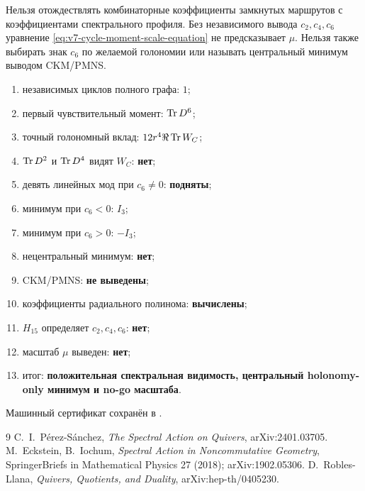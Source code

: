 \begin{nogocriterion}
Нельзя отождествлять комбинаторные коэффициенты замкнутых маршрутов с
коэффициентами спектрального профиля. Без независимого вывода
$c_2,c_4,c_6$ уравнение \eqref{eq:v7-cycle-moment-scale-equation} не
предсказывает $\mu$. Нельзя также выбирать знак $c_6$ по желаемой
голономии или называть центральный минимум выводом CKM/PMNS.
\end{nogocriterion}

\begin{protocol}
\begin{enumerate}
 \item независимых циклов полного графа: \textbf{$1$};
 \item первый чувствительный момент: \textbf{$\operatorname{Tr} D^6$};
 \item точный голономный вклад: \textbf{$12r^4\Re\operatorname{Tr} W_C$};
 \item $\operatorname{Tr} D^2$ и $\operatorname{Tr} D^4$ видят $W_C$: \textbf{нет};
 \item девять линейных мод при $c_6\ne0$: \textbf{подняты};
 \item минимум при $c_6<0$: \textbf{$I_3$};
 \item минимум при $c_6>0$: \textbf{$-I_3$};
 \item нецентральный минимум: \textbf{нет};
 \item CKM/PMNS: \textbf{не выведены};
 \item коэффициенты радиального полинома: \textbf{вычислены};
 \item $H_{15}$ определяет $c_2,c_4,c_6$: \textbf{нет};
 \item масштаб $\mu$ выведен: \textbf{нет};
 \item итог: \textbf{положительная спектральная видимость, центральный
 holonomy-only минимум и no-go масштаба}.
\end{enumerate}
\end{protocol}

Машинный сертификат сохранён в
.

\begin{thebibliography}{9}
C.~I.~P\'erez-S\'anchez,
\emph{The Spectral Action on Quivers}, arXiv:2401.03705.
M.~Eckstein, B.~Iochum,
\emph{Spectral Action in Noncommutative Geometry},
SpringerBriefs in Mathematical Physics 27 (2018); arXiv:1902.05306.
D.~Robles-Llana,
\emph{Quivers, Quotients, and Duality}, arXiv:hep-th/0405230.
\end{thebibliography}